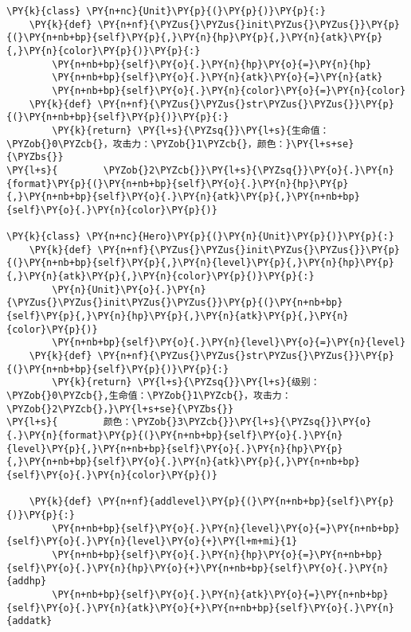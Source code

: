 \begin{Verbatim}[commandchars=\\\{\}]
\PY{k}{class} \PY{n+nc}{Unit}\PY{p}{(}\PY{p}{)}\PY{p}{:}
    \PY{k}{def} \PY{n+nf}{\PYZus{}\PYZus{}init\PYZus{}\PYZus{}}\PY{p}{(}\PY{n+nb+bp}{self}\PY{p}{,}\PY{n}{hp}\PY{p}{,}\PY{n}{atk}\PY{p}{,}\PY{n}{color}\PY{p}{)}\PY{p}{:}
        \PY{n+nb+bp}{self}\PY{o}{.}\PY{n}{hp}\PY{o}{=}\PY{n}{hp}
        \PY{n+nb+bp}{self}\PY{o}{.}\PY{n}{atk}\PY{o}{=}\PY{n}{atk}
        \PY{n+nb+bp}{self}\PY{o}{.}\PY{n}{color}\PY{o}{=}\PY{n}{color}
    \PY{k}{def} \PY{n+nf}{\PYZus{}\PYZus{}str\PYZus{}\PYZus{}}\PY{p}{(}\PY{n+nb+bp}{self}\PY{p}{)}\PY{p}{:}
        \PY{k}{return} \PY{l+s}{\PYZsq{}}\PY{l+s}{生命值：\PYZob{}0\PYZcb{}，攻击力：\PYZob{}1\PYZcb{}，颜色：}\PY{l+s+se}{\PYZbs{}}
\PY{l+s}{        \PYZob{}2\PYZcb{}}\PY{l+s}{\PYZsq{}}\PY{o}{.}\PY{n}{format}\PY{p}{(}\PY{n+nb+bp}{self}\PY{o}{.}\PY{n}{hp}\PY{p}{,}\PY{n+nb+bp}{self}\PY{o}{.}\PY{n}{atk}\PY{p}{,}\PY{n+nb+bp}{self}\PY{o}{.}\PY{n}{color}\PY{p}{)}

\PY{k}{class} \PY{n+nc}{Hero}\PY{p}{(}\PY{n}{Unit}\PY{p}{)}\PY{p}{:}
    \PY{k}{def} \PY{n+nf}{\PYZus{}\PYZus{}init\PYZus{}\PYZus{}}\PY{p}{(}\PY{n+nb+bp}{self}\PY{p}{,}\PY{n}{level}\PY{p}{,}\PY{n}{hp}\PY{p}{,}\PY{n}{atk}\PY{p}{,}\PY{n}{color}\PY{p}{)}\PY{p}{:}
        \PY{n}{Unit}\PY{o}{.}\PY{n}{\PYZus{}\PYZus{}init\PYZus{}\PYZus{}}\PY{p}{(}\PY{n+nb+bp}{self}\PY{p}{,}\PY{n}{hp}\PY{p}{,}\PY{n}{atk}\PY{p}{,}\PY{n}{color}\PY{p}{)}
        \PY{n+nb+bp}{self}\PY{o}{.}\PY{n}{level}\PY{o}{=}\PY{n}{level}
    \PY{k}{def} \PY{n+nf}{\PYZus{}\PYZus{}str\PYZus{}\PYZus{}}\PY{p}{(}\PY{n+nb+bp}{self}\PY{p}{)}\PY{p}{:}
        \PY{k}{return} \PY{l+s}{\PYZsq{}}\PY{l+s}{级别：\PYZob{}0\PYZcb{},生命值：\PYZob{}1\PYZcb{}，攻击力：\PYZob{}2\PYZcb{}，}\PY{l+s+se}{\PYZbs{}}
\PY{l+s}{        颜色：\PYZob{}3\PYZcb{}}\PY{l+s}{\PYZsq{}}\PY{o}{.}\PY{n}{format}\PY{p}{(}\PY{n+nb+bp}{self}\PY{o}{.}\PY{n}{level}\PY{p}{,}\PY{n+nb+bp}{self}\PY{o}{.}\PY{n}{hp}\PY{p}{,}\PY{n+nb+bp}{self}\PY{o}{.}\PY{n}{atk}\PY{p}{,}\PY{n+nb+bp}{self}\PY{o}{.}\PY{n}{color}\PY{p}{)}

    \PY{k}{def} \PY{n+nf}{addlevel}\PY{p}{(}\PY{n+nb+bp}{self}\PY{p}{)}\PY{p}{:}
        \PY{n+nb+bp}{self}\PY{o}{.}\PY{n}{level}\PY{o}{=}\PY{n+nb+bp}{self}\PY{o}{.}\PY{n}{level}\PY{o}{+}\PY{l+m+mi}{1}
        \PY{n+nb+bp}{self}\PY{o}{.}\PY{n}{hp}\PY{o}{=}\PY{n+nb+bp}{self}\PY{o}{.}\PY{n}{hp}\PY{o}{+}\PY{n+nb+bp}{self}\PY{o}{.}\PY{n}{addhp}
        \PY{n+nb+bp}{self}\PY{o}{.}\PY{n}{atk}\PY{o}{=}\PY{n+nb+bp}{self}\PY{o}{.}\PY{n}{atk}\PY{o}{+}\PY{n+nb+bp}{self}\PY{o}{.}\PY{n}{addatk}


\end{Verbatim}

